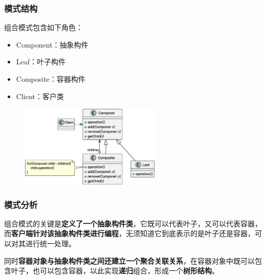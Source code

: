 \subsubsection{模式结构}
组合模式包含如下角色：
\vspace{-0.8em}
\begin{multicols}{2}
    \begin{itemize} 
        \item Component：抽象构件
        \item Leaf：叶子构件
        \item Composite：容器构件
        \item Client：客户类
    \end{itemize}
\end{multicols}
\vspace{-1em}

\begin{figure}[H]
    \vspace{-0.5em}
	\centering
	\includegraphics[width=0.6\textwidth]{images/组合模式结构.eps}
    \vspace{-1em}
\end{figure}

\subsubsection{模式分析}
组合模式的关键是\textbf{定义了一个抽象构件类}，它既可以代表叶子，又可以代表容器，而\textbf{客户端针对该抽象构件类进行编程}，无须知道它到底表示的是叶子还是容器，可以对其进行统一处理。

同时\textbf{容器对象与抽象构件类之间还建立一个聚合关联关系}，在容器对象中既可以包含叶子，也可以包含容器，以此实现\textbf{递归}组合，形成一个\textbf{树形结构}。


